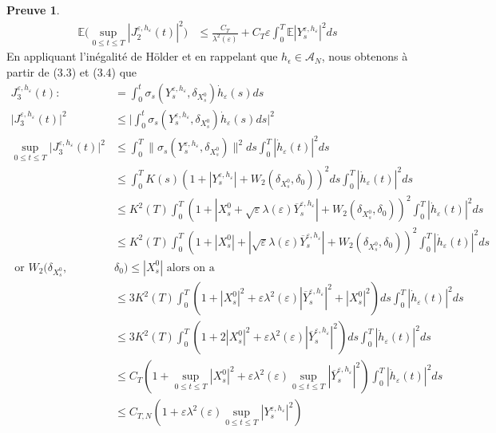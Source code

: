 \documentclass[12pt,a4paper,twoside]{report}%
\theoremstyle{definition}
\newtheorem*{pr}{\textbf{Preuve}}
\numberwithin{equation}{section}
\begin{document}
\begin{pr}
\[\begin{aligned}
\mathbb{E}\Big(\sup_{0 \leq t \leq T}|J_2^{\varepsilon,h_\varepsilon}(t)|^2\Big)&\leq \frac{C_T}{\lambda^2(\varepsilon)} + C_T\varepsilon \int_{0}^{T}\mathbb{E}|Y_s^{\varepsilon,h_\varepsilon}|^2ds
\end{aligned}
\]
En appliquant l'inégalité de Hölder et en rappelant que \(h_{\epsilon} \in \mathcal{A}_{N}\), nous obtenons à partir de (3.3) et (3.4) que
\[
\begin{aligned}
	J_3^{\varepsilon,h_\varepsilon}(t) :&= \int_{0}^{t} \sigma_{s}(Y_{s}^{\varepsilon,h_{\varepsilon}}, \delta_{X_{s}^{0}}) \dot{h}_{\varepsilon}(s) ds\\
	\Big|J_3^{\varepsilon,h_\varepsilon}(t)\Big|^2 &\leq\Big|\int_{0}^{t} \sigma_{s}(Y_{s}^{\varepsilon,h_{\varepsilon}}, \delta_{X_{s}^{0}}) \dot{h}_{\varepsilon}(s) ds\Big|^2\\
	\sup_{0 \leq t \leq T}\Big|J_3^{\varepsilon,h_\varepsilon}(t)\Big|^2 &\leq \int_{0}^{T}\|\sigma_s(Y_{s}^{\varepsilon,h_{\varepsilon}}, \delta_{X_{s}^{0}})\|^2ds\int_{0}^{T}|\dot{h}_\varepsilon(t)|^2ds\\
	&\leq \int_{0}^{T}K(s)(1+|Y_s^{\varepsilon,h_\varepsilon}|+W_2(\delta_{X_s^0},\delta_0))^2ds\int_{0}^{T}|\dot{h}_\varepsilon(t)|^2ds\\
	&\leq K^2(T)\int_{0}^{T}(1 + |X_s^0 +\sqrt{\varepsilon}\lambda(\varepsilon)\overline{Y}_s^{\varepsilon,h_\varepsilon}| + W_2(\delta_{X_s^0},\delta_0))^2\int_{0}^{T}|\dot{h}_\varepsilon(t)|^2ds\\
	&\leq K^2(T)\int_{0}^{T}(1 + |X_s^0| + |\sqrt{\varepsilon}\lambda(\varepsilon)\overline{Y}_s^{\varepsilon,h_\varepsilon}| + W_2(\delta_{X_s^0},\delta_0))^2\int_{0}^{T}|\dot{h}_\varepsilon(t)|^2ds\\
	\text{ or } W_2(\delta_{X_{s}^{0}},&\delta_0) \leq |X_s^0| \text{ alors on a }\\
	&\leq3K^2(T)\int_{0}^{T}(1+|X_s^0|^2 +\varepsilon\lambda^2(\varepsilon)|\overline{Y}_s^{\varepsilon,h_\varepsilon}|^2+ |X_s^0|^2)ds \int_{0}^{T}|\dot{h}_\varepsilon(t)|^2ds\\
	&\leq 3K^2(T)\int_{0}^{T}(1+2|X_s^0|^2 +\varepsilon\lambda^2(\varepsilon)|\overline{Y}_s^{\varepsilon,h_\varepsilon}|^2)ds \int_{0}^{T}|\dot{h}_\varepsilon(t)|^2ds\\
	&\leq C_T(1 + \sup_{0 \leq t \leq T}|X_s^0|^2 +\varepsilon\lambda^2(\varepsilon)\sup_{0 \leq t \leq T}|\overline{Y}_s^{\varepsilon,h_\varepsilon}|^2)\int_{0}^{T}|\dot{h}_\varepsilon(t)|^2ds\\
	&\leq C_{T,N}(1 + \varepsilon\lambda^2(\varepsilon)\sup_{0 \leq t \leq T}|Y_s^{\varepsilon,h_\varepsilon}|^2)

\end{aligned}\]
\end{pr}
\end{document}
